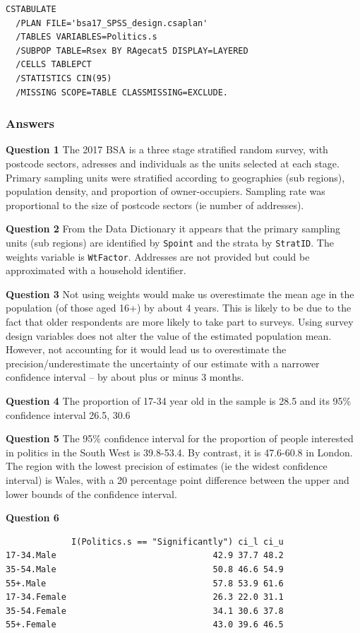 \documentclass[
  14,
  a4paper,
  DIV=11,
  numbers=noendperiod]{scrartcl}
\begin{document}
\begin{verbatim}
CSTABULATE
  /PLAN FILE='bsa17_SPSS_design.csaplan'
  /TABLES VARIABLES=Politics.s
  /SUBPOP TABLE=Rsex BY RAgecat5 DISPLAY=LAYERED
  /CELLS TABLEPCT
  /STATISTICS CIN(95) 
  /MISSING SCOPE=TABLE CLASSMISSING=EXCLUDE.
\end{verbatim}

\hypertarget{answers-1}{%
\subsubsection{Answers}\label{answers-1}}

\textbf{Question 1} The 2017 BSA is a three stage stratified random
survey, with postcode sectors, adresses and individuals as the units
selected at each stage. Primary sampling units were stratified according
to geographies (sub regions), population density, and proportion of
owner-occupiers. Sampling rate was proportional to the size of postcode
sectors (ie number of addresses).

\textbf{Question 2} From the Data Dictionary it appears that the primary
sampling units (sub regions) are identified by \texttt{Spoint} and the
strata by \texttt{StratID}. The weights variable is \texttt{WtFactor}.
Addresses are not provided but could be approximated with a household
identifier.

\textbf{Question 3} Not using weights would make us overestimate the
mean age in the population (of those aged 16+) by about 4 years. This is
likely to be due to the fact that older respondents are more likely to
take part to surveys. Using survey design variables does not alter the
value of the estimated population mean. However, not accounting for it
would lead us to overestimate the precision/underestimate the
uncertainty of our estimate with a narrower confidence interval -- by
about plus or minus 3 months.

\textbf{Question 4} The proportion of 17-34 year old in the sample is
28.5 and its 95\% confidence interval 26.5, 30.6

\textbf{Question 5} The 95\% confidence interval for the proportion of
people interested in politics in the South West is 39.8-53.4. By
contrast, it is 47.6-60.8 in London. The region with the lowest
precision of estimates (ie the widest confidence interval) is Wales,
with a 20 percentage point difference between the upper and lower bounds
of the confidence interval.

\textbf{Question 6}

\begin{verbatim}
             I(Politics.s == "Significantly") ci_l ci_u
17-34.Male                               42.9 37.7 48.2
35-54.Male                               50.8 46.6 54.9
55+.Male                                 57.8 53.9 61.6
17-34.Female                             26.3 22.0 31.1
35-54.Female                             34.1 30.6 37.8
55+.Female                               43.0 39.6 46.5
\end{verbatim}
\end{document}
